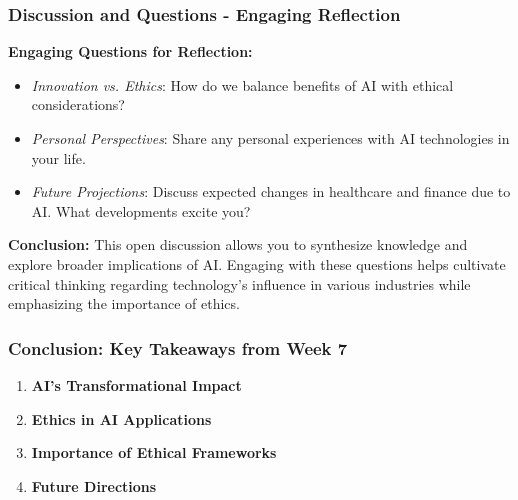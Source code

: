 \documentclass[aspectratio=169]{beamer}
\begin{document}
\begin{frame}[fragile]
    \frametitle{Discussion and Questions - Engaging Reflection}
    \textbf{Engaging Questions for Reflection:}
    \begin{itemize}
        \item \textit{Innovation vs. Ethics}: How do we balance benefits of AI with ethical considerations?
        \item \textit{Personal Perspectives}: Share any personal experiences with AI technologies in your life.
        \item \textit{Future Projections}: Discuss expected changes in healthcare and finance due to AI. What developments excite you?
    \end{itemize}
    
    \textbf{Conclusion:}
    This open discussion allows you to synthesize knowledge and explore broader implications of AI. Engaging with these questions helps cultivate critical thinking regarding technology's influence in various industries while emphasizing the importance of ethics.
\end{frame}

\begin{frame}[fragile]
    \frametitle{Conclusion: Key Takeaways from Week 7}
    
    \begin{enumerate}
        \item \textbf{AI's Transformational Impact}
        \item \textbf{Ethics in AI Applications}
        \item \textbf{Importance of Ethical Frameworks}
        \item \textbf{Future Directions}
    \end{enumerate}
\end{frame}
\end{document}
